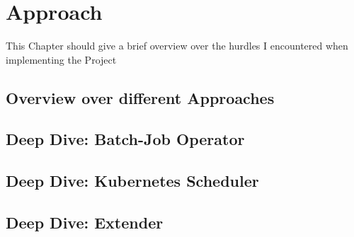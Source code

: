 \chapter{Approach}
This Chapter should give a brief overview over the hurdles I encountered when implementing the Project
\section{Overview over different Approaches}

\section{Deep Dive: Batch-Job Operator}

\section{Deep Dive: Kubernetes Scheduler}

\section{Deep Dive: Extender}
